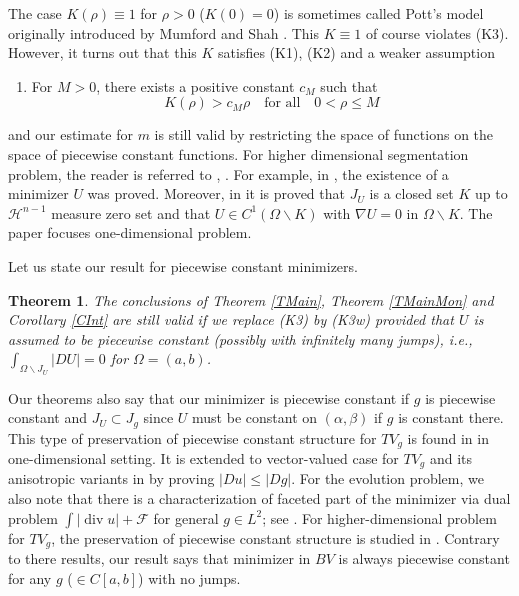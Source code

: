 \documentclass[11pt]{amsart} %
\numberwithin{equation}{section}
\newtheorem{thm}{Theorem}[section]
\begin{document}
The case $K(\rho)\equiv1$ for $\rho>0$ ($K(0)=0$) is sometimes called Pott's model originally introduced by Mumford and Shah \cite{MS89}.
 This $K\equiv1$ of course violates (K3).
 However, it turns out that this $K$ satisfies (K1), (K2) and a weaker assumption
\begin{enumerate}
\item[(K3w)] For $M>0$, there exists a positive constant $c_M$ such that
\[
	K(\rho) > c_M\rho
	\quad\text{for all}\quad
	0 < \rho \le M
\]
\end{enumerate}
and our estimate for $m$ is still valid by restricting the space of functions on the space of piecewise constant functions.
 For higher dimensional segmentation problem, the reader is referred to \cite{CT91}, \cite{MT93}.
 For example, in \cite{CT91}, the existence of a minimizer $U$ was proved.
 Moreover, in \cite{CT91} it is proved that $J_U$ is a closed set $K$ up to $\mathcal{H}^{n-1}$ measure zero set and that $U\in C^1(\Omega\backslash K)$ with $\nabla U=0$ in $\Omega\backslash K$.
 The paper \cite{Cha92} focuses one-dimensional problem.

Let us state our result for piecewise constant minimizers.

\begin{thm} \label{TPie}
	The conclusions of Theorem \ref{TMain}, Theorem \ref{TMainMon} and Corollary \ref{CInt} are still valid if we replace (K3) by (K3w) provided that $U$ is assumed to be piecewise constant (possibly with infinitely many jumps), i.e., $\int_{\Omega\backslash J_U} |DU|=0$ for $\Omega=(a,b)$.
\end{thm}
Our theorems also say that our minimizer is piecewise constant if $g$ is piecewise constant and $J_U\subset J_g$ since $U$ must be constant on $(\alpha,\beta)$ if $g$ is constant there.
 This type of preservation of piecewise constant structure for $TV_g$ is found in  \cite[2.4.2]{BF12} in one-dimensional setting.
 It is extended to vector-valued case for $TV_g$ and its anisotropic variants in \cite{GL19, GL24} by proving $|Du|\le|Dg|$.
 For the evolution problem, we also note that there is a characterization of faceted part of the minimizer via dual problem $\int|\operatorname{div}u|+\mathcal{F}$ for general $g\in L^2$; see \cite[Proposition 4.2]{BCNO11}.
 For higher-dimensional problem for $TV_g$, the preservation of piecewise constant structure is studied in \cite{BCN05, LMM17, KSS19}.
 Contrary to there results, our result says that minimizer in $BV$ is always piecewise constant for any $g$ ($\in C[a,b]$) with no jumps.
\end{document}
